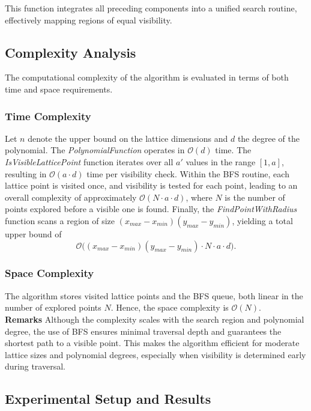 \documentclass[12pt, reqno]{amsart}
\theoremstyle{definition}
\theoremstyle{remark}
\numberwithin{equation}{section}
\begin{document}
This function integrates all preceding components into a unified search routine, effectively mapping regions of equal visibility.


\subsection{Complexity Analysis}

The computational complexity of the algorithm is evaluated in terms of both time and space requirements.

\subsubsection{Time Complexity}
Let $n$ denote the upper bound on the lattice dimensions and $d$ the degree of the polynomial.  
The \textit{PolynomialFunction} operates in $\mathcal{O}(d)$ time.  
The \textit{IsVisibleLatticePoint} function iterates over all $a'$ values in the range $[1,a]$, resulting in $\mathcal{O}(a \cdot d)$ time per visibility check.  
Within the BFS routine, each lattice point is visited once, and visibility is tested for each point, leading to an overall complexity of approximately $\mathcal{O}(N \cdot a \cdot d)$, where $N$ is the number of points explored before a visible one is found.  
Finally, the \textit{FindPointWithRadius} function scans a region of size $(x_{max}-x_{min})(y_{max}-y_{min})$, yielding a total upper bound of 
\[
\mathcal{O}\big((x_{max}-x_{min})(y_{max}-y_{min}) \cdot N \cdot a \cdot d \big).
\]

\subsubsection{Space Complexity}
The algorithm stores visited lattice points and the BFS queue, both linear in the number of explored points $N$.  
Hence, the space complexity is $\mathcal{O}(N)$.\\

\textbf{Remarks}
Although the complexity scales with the search region and polynomial degree, the use of BFS ensures minimal traversal depth and guarantees the shortest path to a visible point.  
This makes the algorithm efficient for moderate lattice sizes and polynomial degrees, especially when visibility is determined early during traversal.
\subsection{Experimental Setup and Results}
\end{document}
